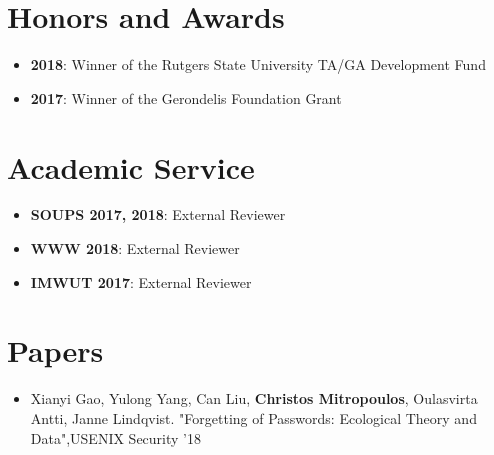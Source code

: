 \documentclass[letterpaper,10pt]{article}
\makeatletter
\newcommand{\resumeItem}[2]{
  \item\small{
    \textbf{#1}{: #2 \vspace{-2pt}}
  }
}
\newcommand{\resumeSubheading}[4]{
  \vspace{-1pt}\item
    \begin{tabular*}{0.97\textwidth}{l@{\extracolsep{\fill}}r}
      \textbf{#1} & #2 \\
      \textit{\small#3} & \textit{\small #4} \\
    \end{tabular*}\vspace{-5pt}
}
\newcommand{\resumeSubHeadingListEnd}{\end{itemize}}
\newcommand{\resumeItemListStart}{\begin{itemize}}
\newcommand{\resumeItemListEnd}{\end{itemize}\vspace{-5pt}}
\makeatother
\begin{document}



\section{Honors and Awards}
\resumeItemListStart
\resumeItem{2018}{ Winner of the Rutgers State University TA/GA Development Fund}
\resumeItem{2017}{ Winner of the Gerondelis Foundation Grant}
\resumeItemListEnd
\section{Academic Service}
\resumeItemListStart
\resumeItem{SOUPS 2017, 2018}{External Reviewer}
\resumeItem{WWW 2018}{External Reviewer}
\resumeItem{IMWUT 2017}{External Reviewer}
\resumeItemListEnd


\section{Papers}
\begin{itemize}
  \item Xianyi Gao, Yulong Yang, Can Liu, \textbf{Christos Mitropoulos}, Oulasvirta Antti, Janne Lindqvist. "Forgetting of Passwords: Ecological Theory and Data",USENIX Security '18\\
\end{itemize}






\end{document}
